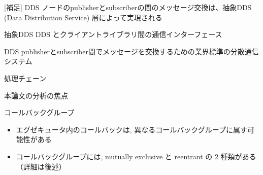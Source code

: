 \begin{frame}{[補足] DDS}
    ノードのpublisherとsubscriberの間のメッセージ交換は、抽象DDS (Data Distribution Service) 層によって実現される

    \begin{block}{抽象DDS}
        DDS とクライアントライブラリ間の通信インターフェース
    \end{block}
    \begin{block}{DDS}
        publisherとsubscriber間でメッセージを交換するための業界標準の分散通信システム
    \end{block}
\end{frame}

\begin{frame}{処理チェーン}
\end{frame}

\begin{frame}{本論文の分析の焦点}
\end{frame}

\begin{frame}{コールバックグループ}
    \begin{itemize}
        \item エグゼキュータ内のコールバックは, 異なるコールバックグループに属す可能性がある
        \item コールバックグループには, mutually exclusive と reentrant の 2 種類がある（詳細は後述）
    \end{itemize}
\end{frame}

